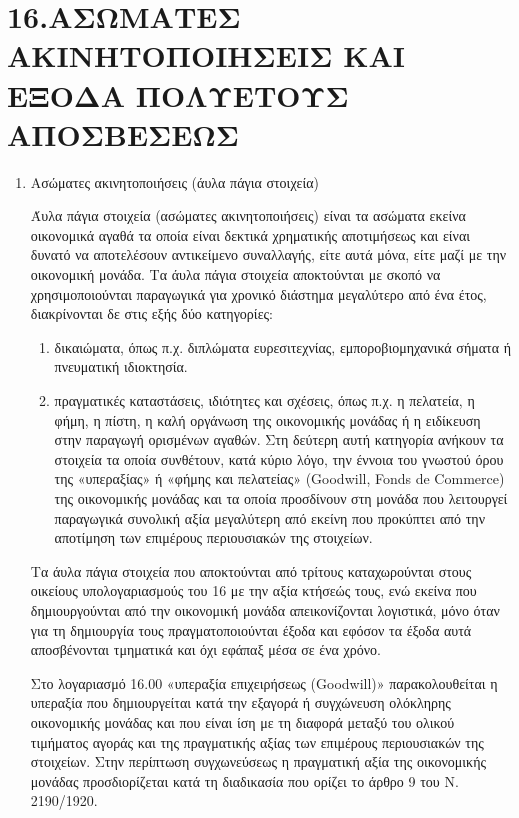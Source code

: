 \documentclass[A4,10pt,greek]{book}
\begin{document}
\section{16.ΑΣΩΜΑΤΕΣ ΑΚΙΝΗΤΟΠΟΙΗΣΕΙΣ ΚΑΙ ΕΞΟΔΑ ΠΟΛΥΕΤΟΥΣ ΑΠΟΣΒΕΣΕΩΣ}

\begin{enumerate}
\item Ασώματες ακινητοποιήσεις (άυλα πάγια στοιχεία)

Άυλα πάγια στοιχεία (ασώματες ακινητοποιήσεις) είναι τα ασώματα εκείνα οικονομικά αγαθά τα οποία είναι δεκτικά χρηματικής αποτιμήσεως και είναι δυνατό να αποτελέσουν αντικείμενο συναλλαγής, είτε αυτά μόνα, είτε μαζί με την οικονομική μονάδα. Τα άυλα πάγια στοιχεία αποκτούνται με σκοπό να χρησιμοποιούνται παραγωγικά για χρονικό διάστημα μεγαλύτερο από ένα έτος, διακρίνονται δε στις εξής δύο κατηγορίες:

\begin{enumerate}
\item δικαιώματα, όπως π.χ. διπλώματα ευρεσιτεχνίας, εμποροβιομηχανικά σήματα ή πνευματική ιδιοκτησία.

\item πραγματικές καταστάσεις, ιδιότητες και σχέσεις, όπως π.χ. η πελατεία, η φήμη, η πίστη, η καλή οργάνωση της οικονομικής μονάδας ή η ειδίκευση στην παραγωγή ορισμένων αγαθών. Στη δεύτερη αυτή κατηγορία ανήκουν τα στοιχεία τα οποία συνθέτουν, κατά κύριο λόγο, την έννοια του γνωστού όρου της «υπεραξίας» ή «φήμης και πελατείας» (Goodwill, Fonds de Commerce) της οικονομικής μονάδας και τα οποία προσδίνουν στη μονάδα που λειτουργεί παραγωγικά συνολική αξία μεγαλύτερη από εκείνη που προκύπτει από την αποτίμηση των επιμέρους περιουσιακών της στοιχείων.
\end{enumerate}

Τα άυλα πάγια στοιχεία που αποκτούνται από τρίτους καταχωρούνται στους οικείους υπολογαριασμούς του 16 με την αξία κτήσεώς τους, ενώ εκείνα που δημιουργούνται από την οικονομική μονάδα απεικονίζονται λογιστικά, μόνο όταν για τη δημιουργία τους πραγματοποιούνται έξοδα και εφόσον τα έξοδα αυτά αποσβένονται τμηματικά και όχι εφάπαξ μέσα σε ένα χρόνο.

Στο λογαριασμό 16.00 «υπεραξία επιχειρήσεως (Goodwill)» παρακολουθείται η υπεραξία που δημιουργείται κατά την εξαγορά ή συγχώνευση ολόκληρης οικονομικής μονάδας και που είναι ίση με τη διαφορά μεταξύ του ολικού τιμήματος αγοράς και της πραγματικής αξίας των επιμέρους περιουσιακών της στοιχείων. Στην περίπτωση συγχωνεύσεως η πραγματική αξία της οικονομικής μονάδας προσδιορίζεται κατά τη διαδικασία που ορίζει το άρθρο 9 του Ν. 2190/1920.


\end{enumerate}
\end{document}
